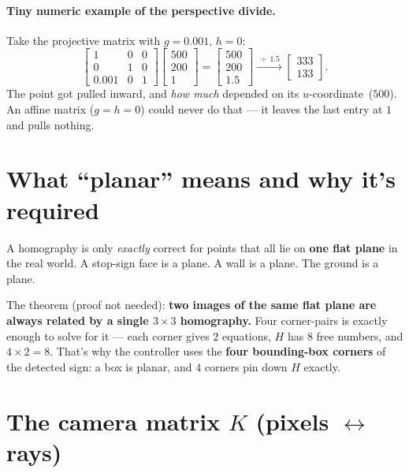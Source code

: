 \documentclass[11pt]{article}
\begin{document}
\paragraph{Tiny numeric example of the perspective divide.}
Take the projective matrix with $g=0.001$, $h=0$:
\[
\begin{bmatrix} 1&0&0\\ 0&1&0\\ 0.001&0&1\end{bmatrix}
\begin{bmatrix} 500\\ 200\\ 1\end{bmatrix}
=\begin{bmatrix} 500\\ 200\\ 1.5\end{bmatrix}
\xrightarrow{\;\div\,1.5\;}
\begin{bmatrix} 333\\ 133\end{bmatrix}.
\]
The point got pulled inward, and \emph{how much} depended on its
$u$-coordinate~($500$). An affine matrix ($g=h=0$) could never do that --- it
leaves the last entry at $1$ and pulls nothing.

\section{What ``planar'' means and why it's required}

A homography is only \emph{exactly} correct for points that all lie on
\textbf{one flat plane} in the real world. A stop-sign face is a plane. A wall
is a plane. The ground is a plane.

The theorem (proof not needed): \textbf{two images of the same flat plane are
always related by a single $3\times3$ homography.} Four corner-pairs is exactly
enough to solve for it --- each corner gives $2$ equations, $H$ has $8$ free
numbers, and $4\times2=8$. That's why the controller uses the \textbf{four
bounding-box corners} of the detected sign: a box is planar, and $4$ corners
pin down $H$ exactly.

\section{The camera matrix $K$ (pixels $\leftrightarrow$ rays)}
\end{document}
